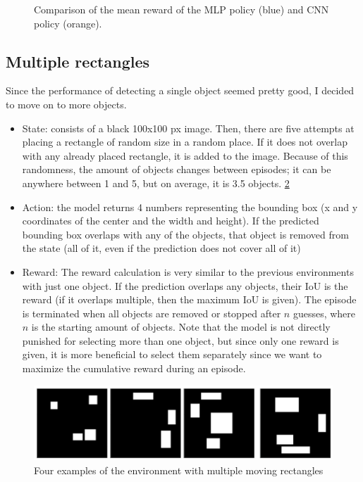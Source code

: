 \documentclass[
  digital,     %
  oneside,     %
  nosansbold,  %
  nocolorbold, %
  lof,         %
  lot,         %
]{fithesis4}
\begin{document}
\begin{figure}
    \centering
    \makebox[\textwidth][c]{}
    \caption{Comparison of the mean reward of the MLP policy (blue) and CNN policy (orange).}
    \label{fig:v2_mlp_cnn}
\end{figure}

\subsection{Multiple rectangles}
Since the performance of detecting a single object seemed pretty good, I decided to move on to more objects.
\begin{itemize}
    \item State: consists of a black 100x100 px image. Then, there are five attempts at placing a rectangle of random size in a random place. If it does not overlap with any already placed rectangle, it is added to the image. Because of this randomness, the amount of objects changes between episodes; it can be anywhere between 1 and 5, but on average, it is 3.5 objects. \ref{fig:env3}
    \item Action: the model returns 4 numbers representing the bounding box (x and y coordinates of the center and the width and height). If the predicted bounding box overlaps with any of the objects, that object is removed from the state (all of it, even if the prediction does not cover all of it)
    \item Reward: The reward calculation is very similar to the previous environments with just one object. If the prediction overlaps any objects, their IoU is the reward (if it overlaps multiple, then the maximum IoU is given). The episode is terminated when all objects are removed or stopped after $n$ guesses, where $n$ is the starting amount of objects. Note that the model is not directly punished for selecting more than one object, but since only one reward is given, it is more beneficial to select them separately since we want to maximize the cumulative reward during an episode.
\end{itemize}

\begin{figure}
    \includegraphics[width=1\linewidth]{env_examples/env3.png}
    \caption{Four examples of the environment with multiple moving rectangles}
    \label{fig:env3}
\end{figure}
\end{document}
